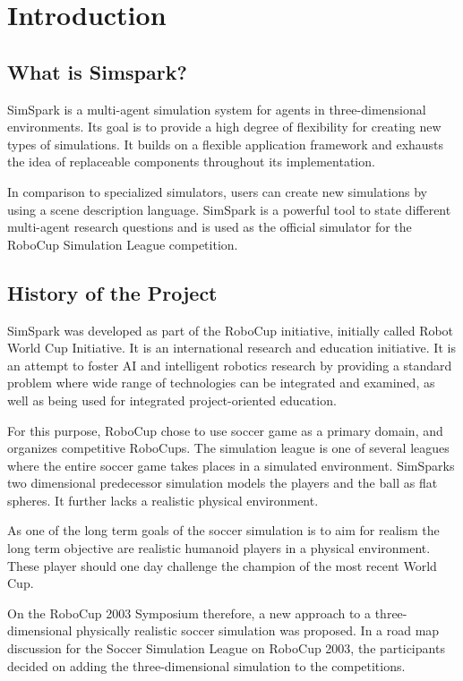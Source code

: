 \chapter{Introduction}

\section{What is Simspark?}

SimSpark is a multi-agent simulation system for agents in
three-dimensional environments. Its goal is to provide a high degree
of flexibility for creating new types of simulations. It builds on a
flexible application framework and exhausts the idea of replaceable
components throughout its implementation.

In comparison to specialized simulators, users can create new
simulations by using a scene description language. SimSpark is a
powerful tool to state different multi-agent research questions and is
used as the official simulator for the RoboCup Simulation League
competition.

\section{History of the Project}

SimSpark was developed as part of the RoboCup initiative, initially
called Robot World Cup Initiative. It is an international research and
education initiative. It is an attempt to foster AI and intelligent
robotics research by providing a standard problem where wide range of
technologies can be integrated and examined, as well as being used for
integrated project-oriented education.

For this purpose, RoboCup chose to use soccer game as a primary
domain, and organizes competitive RoboCups. The simulation league is
one of several leagues where the entire soccer game takes places in a
simulated environment. SimSparks two dimensional predecessor
simulation models the players and the ball as flat spheres. It further
lacks a realistic physical environment.

As one of the long term goals of the soccer simulation is to aim for
realism the long term objective are realistic humanoid players in a
physical environment. These player should one day challenge the
champion of the most recent World Cup.

On the RoboCup 2003 Symposium therefore, a new approach to a
three-dimensional physically realistic soccer simulation was
proposed. In a road map discussion for the Soccer Simulation League on
RoboCup 2003, the participants decided on adding the three-dimensional
simulation to the competitions.

